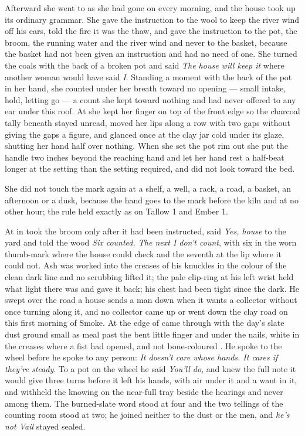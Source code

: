 Afterward she went to  as she had gone on every morning, and the house took up its ordinary grammar. She gave the instruction to the wool to keep the river wind off his ears, told the fire it was the thaw, and gave the instruction to the pot, the broom, the running water and the river wind and never to the basket, because the basket had not been given an instruction and had no need of one. She turned the coals with the back of a broken pot and said \emph{The house will keep it} where another woman would have said \emph{I}. Standing a moment with the back of the pot in her hand, she counted under her breath toward no opening --- small intake, hold, letting go --- a count she kept toward nothing and had never offered to any ear under this roof. At  she kept her finger on top of the front edge so the charcoal tally beneath stayed unread, moved her lips along a row with two gaps without giving the gaps a figure, and glanced once at the clay jar cold under its glaze, shutting her hand half over nothing. When she set the pot rim out she put the handle two inches beyond the reaching hand and let her hand rest a half-beat longer at the setting than the setting required, and did not look toward the bed.

She did not touch the mark again at a shelf, a well, a rack, a road, a basket, an afternoon or a dusk, because the hand goes to the mark before the kiln and at no other hour; the rule held exactly as on Tallow 1 and Ember 1.

At  in   took the broom only after it had been instructed, said \emph{Yes, house} to the yard and told the wood \emph{Six counted. The next I don't count}, with six in the worn thumb-mark where the house could check and the seventh at the lip where it could not. Ash was worked into the creases of his knuckles in the colour of the clean dark line and no scrubbing lifted it; the pale clip-ring at his left wrist held what light there was and gave it back; his chest had been tight since the dark. He swept over the road a house sends a man down when it wants a collector without once turning along it, and no collector came up or went down the clay road on this first morning of Smoke. At the edge of   came through with the day's slate dust ground small as meal past the bent little finger and under the nails, white in the creases where a fist had opened, and not bone-coloured . He spoke to the wheel before he spoke to any person: \emph{It doesn't care whose hands. It cares if they're steady}. To a pot on the wheel he said \emph{You'll do}, and knew the full note it would give three turns before it left his hands, with air under it and a want in it, and withheld the knowing on the near-full tray beside the hearings and never among them. The burned-slate word stood at four and the two tellings of the counting room stood at two; he joined neither to the dust or the men, and \emph{he's not Vail} stayed sealed.

